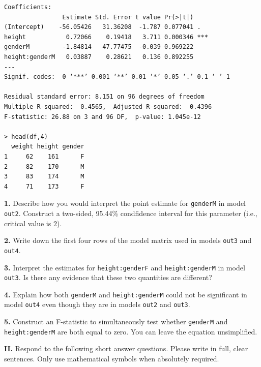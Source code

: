 \documentclass[12pt]{article}
\begin{document}
\begin{verbatim}
Coefficients:
                Estimate Std. Error t value Pr(>|t|)
(Intercept)    -56.05426   31.36208  -1.787 0.077041 .
height           0.72066    0.19418   3.711 0.000346 ***
genderM         -1.84814   47.77475  -0.039 0.969222
height:genderM   0.03887    0.28621   0.136 0.892255
---
Signif. codes:  0 ‘***’ 0.001 ‘**’ 0.01 ‘*’ 0.05 ‘.’ 0.1 ‘ ’ 1

Residual standard error: 8.151 on 96 degrees of freedom
Multiple R-squared:  0.4565,  Adjusted R-squared:  0.4396
F-statistic: 26.88 on 3 and 96 DF,  p-value: 1.045e-12

> head(df,4)
  weight height gender
1     62    161      F
2     82    170      M
3     83    174      M
4     71    173      F

\end{verbatim}

{\bf 1.} Describe how you would interpret the point estimate for \texttt{genderM}
in model \texttt{out2}. Construct a two-sided, 95.44\% condfidence interval for
this parameter (i.e., critical value is $2$).

{\bf 2.} Write down the first four rows of the model matrix used in models
\texttt{out3} and \texttt{out4}.

{\bf 3.} Interpret the estimates for \texttt{height:genderF} and \texttt{height:genderM}
in model \texttt{out3}. Is there any evidence that these two quantities are different?

{\bf 4.} Explain how both \texttt{genderM} and \texttt{height:genderM} could not
be significant in model \texttt{out4} even though they are in models \texttt{out2}
and \texttt{out3}.

{\bf 5.} Construct an F-statistic to simultaneously test whether \texttt{genderM}
and \texttt{height:genderM} are both equal to zero. You can leave the equation
unsimplified.


\newpage

{\bf II.} Respond to the following short answer questions. Please write in full,
clear sentences. Only use mathematical symbols when absolutely required.
\end{document}
